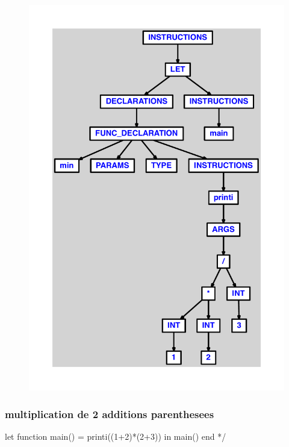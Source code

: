 \documentclass{article}
\begin{document}
\begin{figure}[H]\centering\includegraphics[max width=\textwidth]{ast/ast_102.pdf}\end{figure}\subsubsection{multiplication de 2 additions parenthesees}
\begin{verbatimtab}
let function main() = printi((1+2)*(2+3)) in main() end */
\end{verbatimtab}
\end{document}
